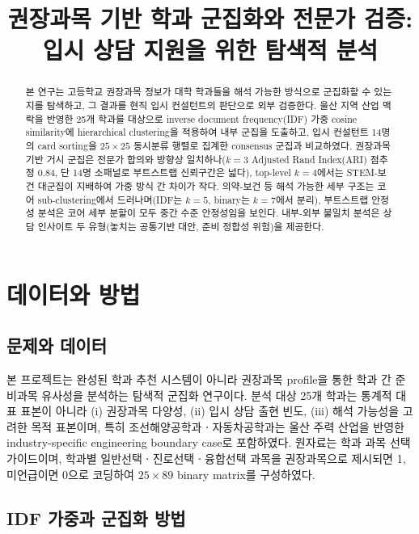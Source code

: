 \documentclass[conference]{IEEEtran}
\title{권장과목 기반 학과 군집화와 전문가 검증: 입시 상담 지원을 위한 탐색적 분석}
\author{
  \IEEEauthorblockN{박재우}
  \IEEEauthorblockA{NOVA50301 Term Project --- Progress Report}
}
\begin{document}
\maketitle

\begin{abstract}
본 연구는 고등학교 권장과목 정보가 대학 학과들을 해석 가능한 방식으로 군집화할 수 있는지를 탐색하고, 그 결과를 현직 입시 컨설턴트의 판단으로 외부 검증한다.
울산 지역 산업 맥락을 반영한 25개 학과를 대상으로 inverse document frequency(IDF) 가중 cosine similarity에 hierarchical clustering을 적용하여 내부 군집을 도출하고, 입시 컨설턴트 14명의 card sorting을 $25\times25$ 동시분류 행렬로 집계한 consensus 군집과 비교하였다.
권장과목 기반 거시 군집은 전문가 합의와 방향상 일치하나($k=3$ Adjusted Rand Index(ARI) 점추정 $0.84$, 단 14명 소패널로 부트스트랩 신뢰구간은 넓다), top-level $k=4$에서는 STEM-보건 대군집이 지배하여 가중 방식 간 차이가 작다.
의약-보건 등 해석 가능한 세부 구조는 코어 sub-clustering에서 드러나며(IDF는 $k=5$, binary는 $k=7$에서 분리), 부트스트랩 안정성 분석은 코어 세부 분할이 모두 중간 수준 안정성임을 보인다. 내부-외부 불일치 분석은 상담 인사이트 두 유형(놓치는 공통기반 대안, 준비 정합성 위험)을 제공한다.
\end{abstract}

\section{데이터와 방법}

\subsection{문제와 데이터}

본 프로젝트는 완성된 학과 추천 시스템이 아니라 권장과목 profile을 통한 학과 간 준비과목 유사성을 분석하는 탐색적 군집화 연구이다.
분석 대상 25개 학과는 통계적 대표 표본이 아니라 (i) 권장과목 다양성, (ii) 입시 상담 출현 빈도, (iii) 해석 가능성을 고려한 목적 표본이며, 특히 조선해양공학과ㆍ자동차공학과는 울산 주력 산업을 반영한 industry-specific engineering boundary case로 포함하였다.
원자료는 학과 과목 선택 가이드이며, 학과별 일반선택ㆍ진로선택ㆍ융합선택 과목을 권장과목으로 제시되면 1, 미언급이면 0으로 코딩하여 $25\times89$ binary matrix를 구성하였다.

\subsection{IDF 가중과 군집화 방법}
\end{document}
